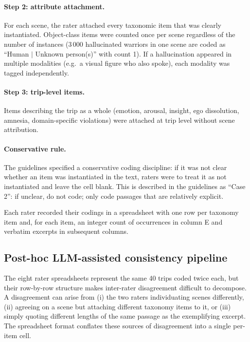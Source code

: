 \paragraph{Step 2: attribute attachment.} For each scene, the rater attached every taxonomic item that was clearly instantiated. Object-class items were counted once per scene regardless of the number of instances (3\,000 hallucinated warriors in one scene are coded as ``Human $|$ Unknown person(s)'' with count 1). If a hallucination appeared in multiple modalities (e.g.\ a visual figure who also spoke), each modality was tagged independently.

\paragraph{Step 3: trip-level items.} Items describing the trip as a whole (emotion, arousal, insight, ego dissolution, amnesia, domain-specific violations) were attached at trip level without scene attribution.

\paragraph{Conservative rule.} The guidelines specified a conservative coding discipline: if it was not clear whether an item was instantiated in the text, raters were to treat it as not instantiated and leave the cell blank. This is described in the guidelines as ``Case 2'': if unclear, do not code; only code passages that are relatively explicit.

Each rater recorded their codings in a spreadsheet with one row per taxonomy item and, for each item, an integer count of occurrences in column E and verbatim excerpts in subsequent columns.

\subsection{Post-hoc LLM-assisted consistency pipeline}
\label{sec:pipeline}

The eight rater spreadsheets represent the same 40 trips coded twice each, but their row-by-row structure makes inter-rater disagreement difficult to decompose. A disagreement can arise from (i) the two raters individuating scenes differently, (ii) agreeing on a scene but attaching different taxonomy items to it, or (iii) simply quoting different lengths of the same passage as the exemplifying excerpt. The spreadsheet format conflates these sources of disagreement into a single per-item cell.

